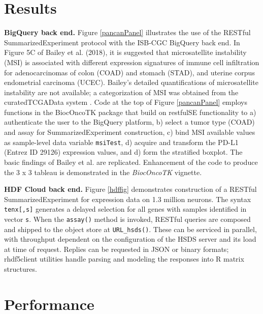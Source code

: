 \documentclass[applications]{gen-bioinformatics}
\newcommand{\Rpackage}[1]{{\textit{#1}}}
\begin{document}
\section*{Results}

\textbf{BigQuery back end.} Figure \ref{pancanPanel} illustrates the 
use of the RESTful SummarizedExperiment protocol
with the ISB-CGC BigQuery back end.  In Figure 5C
of Bailey et al. (2018), it is suggested that
microsatellite instability (MSI) is associated with
different expression signatures of immune cell infiltration
for adenocarcinomas of colon (COAD) and stomach (STAD), and
uterine corpus endometrial carcinoma (UCEC).  Bailey's
detailed quantifications of microsatellite instability
are not available; a categorization of MSI was
obtained from the curatedTCGAData system \citep{Ramos2017}.
Code at the top of Figure \ref{pancanPanel} employs
functions in the BiocOncoTK package that build on
restfulSE functionality to a) authenticate the
user to the BigQuery platform, b) select a tumor
type (COAD) and assay for SummarizedExperiment
construction, c) bind MSI available values as
sample-level data variable \verb+msiTest+, d)
acquire and transform the PD-L1 
(Entrez ID 29126)
expression values, and d) form the stratified boxplot. 
The basic findings of Bailey et al. are replicated.
Enhancement of the code to produce the 3 x 3 tableau
is demonstrated in the \Rpackage{BiocOncoTK} vignette.

\noindent
\textbf{HDF Cloud back end.}  Figure \ref{hdffig}
demonstrates construction of a RESTful SummarizedExperiment
for expression data on 1.3 million neurons.
The syntax \verb+tenx[,s]+ generates a delayed selection for
all genes with samples 
identified in vector \verb+s+.  When the \verb+assay()+
method is invoked, RESTful queries are composed and
shipped to the object store at \verb+URL_hsds()+.
These can be serviced in parallel, with
throughput dependent on the configuration
of the HSDS server and its load at time of request.
Replies can be requested in JSON or binary formats;
rhdf5client utilities handle parsing and modeling the
responses into R matrix structures.

\section*{Performance}
\end{document}
